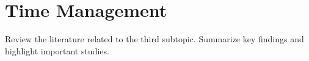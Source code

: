 \section{Time Management}
\label{sec:time_method}

Review the literature related to the third subtopic. Summarize key findings and highlight important studies.